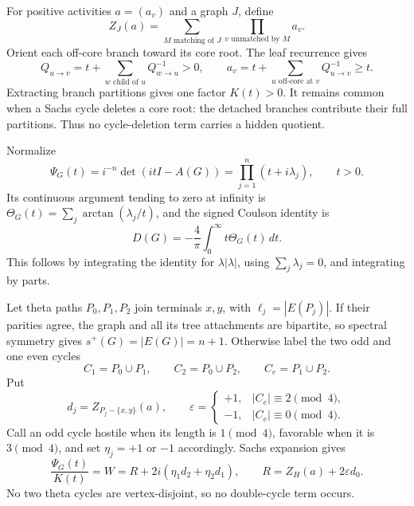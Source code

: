 \documentclass[11pt]{article}
\theoremstyle{remark}
\newcommand{\splus}{s^+}
\begin{document}
For positive activities $a=(a_v)$ and a graph $J$, define
\begin{equation}\label{eq:Z}
 Z_J(a)=\sum_{M\text{ matching of }J}
             \prod_{v\text{ unmatched by }M}a_v.
\end{equation}
Orient each off-core branch toward its core root.  The leaf recurrence gives
\begin{equation}\label{eq:messages}
 Q_{u\to v}=t+\sum_{w\text{ child of }u}Q_{w\to u}^{-1}>0,
 \qquad
 a_v=t+\sum_{u\text{ off-core at }v}Q_{u\to v}^{-1}\geq t.
\end{equation}
Extracting branch partitions gives one factor $K(t)>0$.  It remains common
when a Sachs cycle deletes a core root: the detached branches contribute their
full partitions.  Thus no cycle-deletion term carries a hidden quotient.

Normalize
\begin{equation}\label{eq:Psi}
 \Psi_G(t)=i^{-n}\det(itI-A(G))=\prod_{j=1}^n(t+i\lambda_j),\qquad t>0.
\end{equation}
Its continuous argument tending to zero at infinity is
$\Theta_G(t)=\sum_j\arctan(\lambda_j/t)$, and the signed Coulson identity is
\begin{equation}\label{eq:coulson}
 D(G)=-\frac4\pi\int_0^\infty t\Theta_G(t)\,dt.
\end{equation}
This follows by integrating the identity for $\lambda|\lambda|$, using
$\sum_j\lambda_j=0$, and integrating by parts.

Let theta paths $P_0,P_1,P_2$ join terminals $x,y$, with
$\ell_j=|E(P_j)|$.  If their parities agree, the graph and all its tree
attachments are bipartite, so spectral symmetry gives
$\splus(G)=|E(G)|=n+1$.  Otherwise label the two odd and one even cycles
\begin{equation}\label{eq:cycles}
 C_1=P_0\cup P_1,\qquad C_2=P_0\cup P_2,
 \qquad C_e=P_1\cup P_2.
\end{equation}
Put
\[
 d_j=Z_{P_j-\{x,y\}}(a),\qquad
 \varepsilon=\begin{cases}+1,&|C_e|\equiv2\pmod4,\\
                           -1,&|C_e|\equiv0\pmod4.
             \end{cases}
\]
Call an odd cycle hostile when its length is $1\pmod4$, favorable when it is
$3\pmod4$, and set $\eta_j=+1$ or $-1$ accordingly.  Sachs expansion gives
\begin{equation}\label{eq:sachs-theta}
 \frac{\Psi_G(t)}{K(t)}=W=R+2i(\eta_1d_2+\eta_2d_1),
 \qquad R=Z_H(a)+2\varepsilon d_0.
\end{equation}
No two theta cycles are vertex-disjoint, so no double-cycle term occurs.
\end{document}
